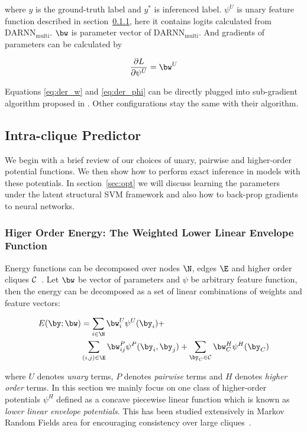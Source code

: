 \documentclass[sigconf]{acmart}
\renewcommand{\cite}{\citep}
\begin{document}
\noindent where $y$ is the ground-truth label and $y^*$ is
inferenced label. $\psi^U$ is unary feature function described in
section~\ref{sec:llep}, here it contains logits calculated from
$\text{DARNN}_{\text{multi}}$. $\bw$ is parameter vector of
$\text{DARNN}_{\text{multi}}$. And gradients of parameters can be
calculated by

\begin{align}
  \label{eq:der_phi}
  \frac{\partial L}{\partial \psi^U} = \bw^U
\end{align}

Equations \eqref{eq:der_w} and \eqref{eq:der_phi} can be directly plugged
into sub-gradient algorithm proposed in \cite{witoonchart2017application}.
Other configurations stay the same with their algorithm.

\subsection{Intra-clique Predictor}
\label{sec:srp}

We begin with a brief review of our choices of unary, pairwise
and higher-order potential functions. We then show how to perform
exact inference in models with these potentials. In
section~\ref{sec:opt} we will discuss learning the
parameters under the latent structural SVM framework and also how
to back-prop gradients to neural networks.


\subsubsection{Higer Order Energy: The Weighted Lower Linear
  Envelope Function}
\label{sec:llep}

Energy functions can be decomposed over nodes $\N$, edges $\E$
and higher order cliques $\cal C$~\cite{Szummer:ECCV08}. Let
$\bw$ be vector of parameters and $\psi$ be arbitrary feature
function, then the energy can be decomposed as a set of linear
combinations of weights and feature vectors:

\begin{align}
  \label{eq:energyfunction_UPH}
  E(\by;\bw)&=\sum_{i\in \N}{\bw_i^U\psi^U(\by_i)}+ \notag\\
  & \sum_{(i,j)\in \E}{\bw_{ij}^P\psi^P(\by_i,\by_j)}+
  \sum_{\by_C\in \cal C}{\bw_C^H\psi^H(\by_C)}
\end{align}

\noindent where $U$ denotes \emph{unary} terms, $P$ denotes
\emph{pairwise} terms and $H$ denotes \emph{higher order} terms.
In this section we mainly focus on one class of higher-order
potentials $\psi^H$ defined as a concave piecewise linear
function which is known as \emph{lower linear envelope
  potentials}. This has been studied extensively in Markov Random
Fields area for encouraging consistency over large
cliques~\cite{Kohli:CVPR07,Nowozin:2011,Gould:ICML2011}.
\end{document}
